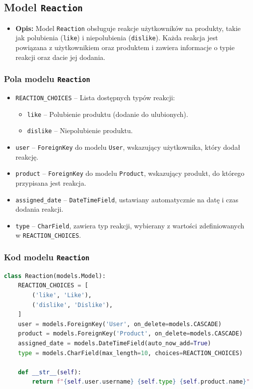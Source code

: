 \documentclass[12pt,a4paper,oneside]{article}
\theoremstyle{definition}
\numberwithin{equation}{section}
\begin{document}
% 
% 
\clearpage
\subsection{Model \texttt{Reaction}}
\begin{itemize}
    \item \textbf{Opis:} 
    Model \texttt{Reaction} obsługuje reakcje użytkowników na produkty, takie jak polubienia (\texttt{like}) i niepolubienia (\texttt{dislike}). Każda reakcja jest powiązana z użytkownikiem oraz produktem i zawiera informacje o typie reakcji oraz dacie jej dodania.
\end{itemize}

\subsubsection{Pola modelu \texttt{Reaction}}
\begin{itemize}
    \item \texttt{REACTION\_CHOICES} – Lista dostępnych typów reakcji:
    \begin{itemize}
        \item \texttt{like} – Polubienie produktu (dodanie do ulubionych).
        \item \texttt{dislike} – Niepolubienie produktu.
    \end{itemize}
    \item \texttt{user} – \texttt{ForeignKey} do modelu \texttt{User}, wskazujący użytkownika, który dodał reakcję.
    \item \texttt{product} – \texttt{ForeignKey} do modelu \texttt{Product}, wskazujący produkt, do którego przypisana jest reakcja.
    \item \texttt{assigned\_date} – \texttt{DateTimeField}, ustawiany automatycznie na datę i czas dodania reakcji.
    \item \texttt{type} – \texttt{CharField}, zawiera typ reakcji, wybierany z wartości zdefiniowanych w \texttt{REACTION\_CHOICES}.
\end{itemize}

\subsubsection{Kod modelu \texttt{Reaction}}
\begin{lstlisting}[language=Python, caption=Model \texttt{Reaction}]
class Reaction(models.Model):
    REACTION_CHOICES = [
        ('like', 'Like'),
        ('dislike', 'Dislike'),
    ]
    user = models.ForeignKey('User', on_delete=models.CASCADE)
    product = models.ForeignKey('Product', on_delete=models.CASCADE)
    assigned_date = models.DateTimeField(auto_now_add=True)
    type = models.CharField(max_length=10, choices=REACTION_CHOICES)

    def __str__(self):
        return f"{self.user.username} {self.type} {self.product.name}"
\end{lstlisting}
\end{document}
